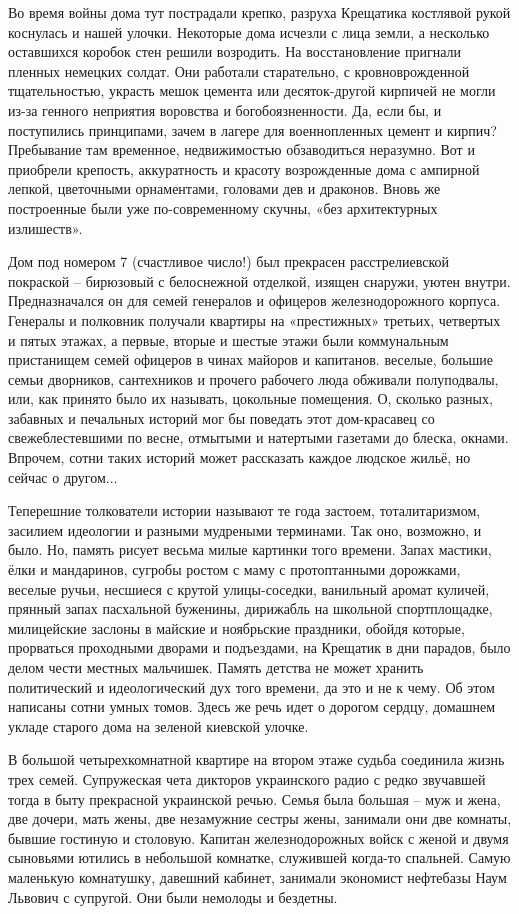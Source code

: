 Во время войны дома тут пострадали крепко, разруха Крещатика костлявой рукой
коснулась и нашей улочки. Некоторые дома исчезли с лица земли, а несколько
оставшихся коробок стен решили возродить. На восстановление пригнали пленных
немецких солдат. Они работали старательно, с кровноврожденной тщательностью,
украсть мешок цемента или десяток-другой кирпичей не могли из-за генного
неприятия воровства и богобоязненности. Да, если бы, и поступились принципами,
зачем в лагере для военнопленных цемент и кирпич? Пребывание там временное,
недвижимостью обзаводиться неразумно. Вот и приобрели крепость, аккуратность и
красоту возрожденные дома с ампирной лепкой, цветочными орнаментами, головами
дев и драконов. Вновь же построенные были уже по-современному скучны, «без
архитектурных излишеств».

Дом под номером 7 (счастливое число!) был прекрасен расстрелиевской покраской –
бирюзовый с белоснежной отделкой, изящен снаружи, уютен внутри. Предназначался
он для семей генералов и офицеров железнодорожного корпуса. Генералы и
полковник получали квартиры на «престижных» третьих, четвертых и пятых этажах,
а первые, вторые и шестые этажи были коммунальным пристанищем семей офицеров в
чинах майоров и капитанов. веселые, большие семьи дворников, сантехников и
прочего рабочего люда обживали полуподвалы, или, как принято было их называть,
цокольные помещения. О, сколько разных, забавных и печальных историй мог бы
поведать этот дом-красавец со свежеблестевшими по весне, отмытыми и натертыми
газетами до блеска, окнами. Впрочем, сотни таких историй может рассказать
каждое людское жильё, но сейчас о другом...

Теперешние толкователи истории называют те года застоем, тоталитаризмом,
засилием идеологии и разными мудреными терминами. Так оно, возможно, и было.
Но, память рисует весьма милые картинки того времени. Запах мастики, ёлки и
мандаринов, сугробы ростом с маму с протоптанными дорожками, веселые ручьи,
несшиеся с крутой улицы-соседки, ванильный аромат куличей, прянный запах
пасхальной буженины, дирижабль на школьной спортплощадке, милицейские заслоны в
майские и ноябрьские праздники, обойдя которые, прорваться проходными дворами и
подъездами, на Крещатик в дни парадов, было делом чести местных мальчишек.
Память детства не может хранить политический и идеологический дух того времени,
да это и не к чему. Об этом написаны сотни умных томов. Здесь же речь идет о
дорогом сердцу, домашнем укладе старого дома на зеленой киевской улочке.

В большой четырехкомнатной квартире на втором этаже судьба соединила жизнь трех
семей. Супружеская чета дикторов украинского радио с редко звучавшей тогда в
быту прекрасной украинской речью. Семья была большая – муж и жена, две дочери,
мать жены, две незамужние сестры жены, занимали они две комнаты, бывшие
гостиную и столовую. Капитан железнодорожных войск с женой и двумя сыновьями
ютились в небольшой комнатке, служившей когда-то спальней. Самую маленькую
комнатушку, давешний кабинет, занимали экономист нефтебазы Наум Львович с
супругой. Они были немолоды и бездетны.

